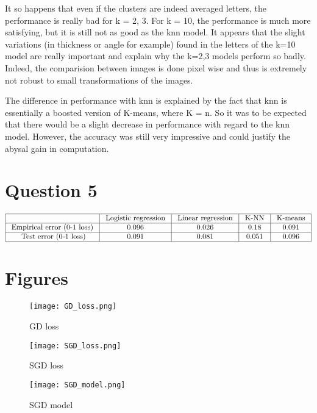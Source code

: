 \documentclass{article}
\begin{document}
It so happens that even if the clusters are indeed averaged letters, the performance is really bad for k = 2, 3.
For k = 10, the performance is much more satisfying, but it is still not as good as the knn model.
It appears that the slight variations (in thickness or angle for example) found in the letters of the k=10 model are really important and explain why the k=2,3 models perform so badly. Indeed, the comparision between images is done pixel wise and thus is extremely not robust to small transformations of the images.

The difference in performance with knn is explained by the fact that knn is essentially a boosted version of K-means, where K = n. So it was to be expected that there would be a slight decrease in performance with regard to the knn model. However, the accuracy was still very impressive and could justify the abysal gain in computation.

\section{Question 5}

$$\begin{array}{|c|c|c|c|c|}
    \hline & \text { Logistic\ regression } & \text { Linear\ regression } & \text { K-NN } & \text { K-means }\\
    \hline \text { Empirical\ error\ (0-1\ loss) } & 0.096 & 0.026 & 0.18 & 0.091 \\
    \hline \text { Test error\ (0-1\ loss)} & 0.091 & 0.081 & 0.051 & 0.096 \\
    \hline
    \end{array}$$

\section{Figures}

\begin{figure}[h]
\centering
\texttt{[image: GD\_loss.png]}
\caption{GD loss}
\end{figure}

\begin{figure}[h]
\centering
\texttt{[image: SGD\_loss.png]}
\caption{SGD loss}
\end{figure}

\begin{figure}[h]
\centering
\texttt{[image: SGD\_model.png]}
\caption{SGD model}
\end{figure}
\end{document}
